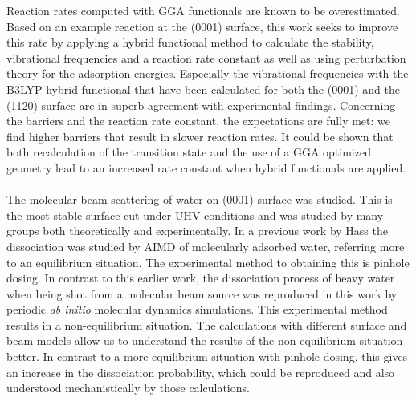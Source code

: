 \documentclass[11pt,DIV=13,BCOR=5mm,a4paper,headinclude]{scrbook}
\begin{document}
Reaction rates computed with GGA functionals are known to be overestimated.
Based on an example reaction at the (0001) surface, this work seeks to improve this rate by applying a hybrid functional method to calculate the stability, vibrational frequencies and a reaction rate constant as well as using perturbation theory for the adsorption energies.
Especially the vibrational frequencies with the B3LYP hybrid functional that have been calculated for both the (0001) and the (11\=20) surface are in superb agreement with experimental findings.
Concerning the barriers and the reaction rate constant, the expectations are fully met: we find higher barriers that result in slower reaction rates.
It could be shown that both recalculation of the transition state and the use of a GGA optimized geometry lead to an increased rate constant when hybrid functionals are applied.
\\\\

The molecular beam scattering of water on (0001) surface was studied.
This is the most stable surface cut under UHV conditions and was studied by many groups both theoretically and experimentally.
In a previous work by Hass the dissociation was studied by AIMD of molecularly adsorbed water, referring more to an equilibrium situation.
The experimental method to obtaining this is pinhole dosing.
In contrast to this earlier work, the dissociation process of heavy water when being shot from a molecular beam source was reproduced in this work by periodic \textit{ab initio} molecular dynamics simulations.
This experimental method results in a non-equilibrium situation.
The calculations with different surface and beam models allow us to understand the results of the non-equilibrium situation better.
In contrast to a more equilibrium situation with pinhole dosing, this gives an increase in the dissociation probability, which could be reproduced and also understood mechanistically by those calculations.


\end{document}
